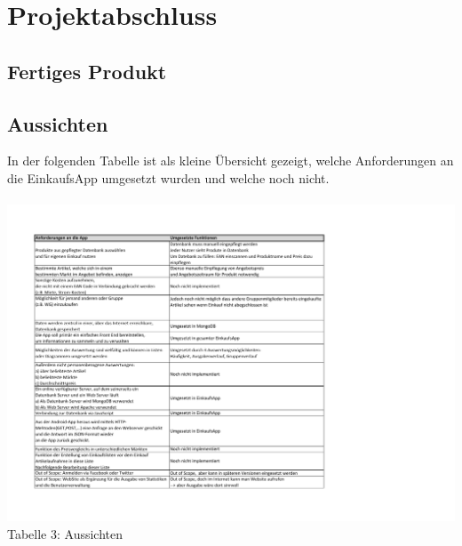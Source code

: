 \documentclass[12pt,a4paper]{article}
\begin{document}
\section{Projektabschluss}
\subsection{Fertiges Produkt}
\subsection{Aussichten}
In der folgenden Tabelle ist als kleine Übersicht gezeigt, welche Anforderungen an die EinkaufsApp umgesetzt wurden und welche noch nicht. 
\\
\\
\hspace*{-10mm} 
\includegraphics[trim = 17mm 10mm 0mm 20mm,clip,scale=0.9]{Anforderungen-Probleme.pdf}
\\
\footnotesize Tabelle 3: Aussichten
\normalsize
\newpage
\end{document}
